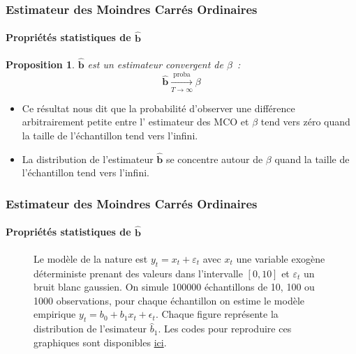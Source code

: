 \documentclass[10pt]{beamer}
\theoremstyle{plain}
\newtheorem{prop}{Proposition}
\begin{document}
\begin{frame}
  \frametitle{Estimateur des Moindres Carrés Ordinaires}
  \framesubtitle {Propriétés statistiques de $\hat{\mathbf b}$}


  \begin{prop}\label{prop:mco:convergence}
    $\hat{\mathbf b}$ est un estimateur convergent de $\beta$~:
    \[
      \hat{\mathbf b} \underset{T\to\infty}{\overset{\text{proba}}{\longrightarrow}} \beta
    \]
  \end{prop}

  \bigskip\bigskip

  \begin{itemize}

  \item Ce résultat nous dit que la probabilité d'observer une différence arbitrairement petite entre l' estimateur des MCO et $\beta$ tend vers zéro quand la taille de l'échantillon tend vers l'infini.\newline

  \item La distribution de l'estimateur $\hat{\mathbf b}$ se concentre autour de $\beta$ quand la taille de l'échantillon tend vers l'infini.

  \end{itemize}

\end{frame}

\clearpage

\begin{frame}
  \frametitle{Estimateur des Moindres Carrés Ordinaires}
  \framesubtitle {Propriétés statistiques de $\hat{\mathbf b}$}

  \begin{figure}
    \centering
      \scalebox{.425}{
    }
  \caption{Le modèle de la nature est $y_t = x_t + \varepsilon_t$ avec $x_t$ une variable exogène déterministe prenant des valeurs dans l'intervalle $[0,10]$ et $\varepsilon_t$ un bruit blanc gaussien. On simule 100000  échantillons de 10, 100 ou 1000 observations, pour chaque échantillon on estime le modèle empirique $y_t = b_0 + b_1 x_t + \epsilon_t$. Chaque figure représente la distribution de l'esimateur $\hat b_1$. Les codes pour reproduire ces graphiques sont disponibles \href{https://mnemosyne.ithaca.fr/stephane/econometrics/src/commit/\HEAD/cours/codes/chapitre-1/ols-convergence.py}{ici}.}
\end{figure}
\end{frame}
\end{document}
